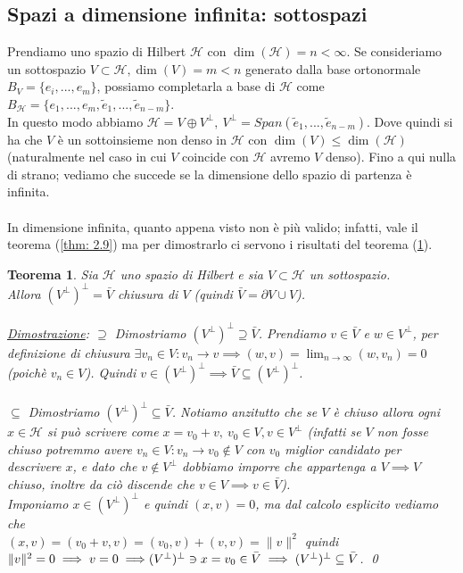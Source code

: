\documentclass[a4paper,12pt]{report}
\newtheorem{teorema}{Teorema}[chapter]
\newcommand{\lt}{<}
\begin{document}
\newpage

\subsection{Spazi a dimensione infinita: sottospazi}

Prendiamo uno spazio di Hilbert $\mathscr{H}$ con $\dim(\mathscr{H})=n \lt\infty$. Se consideriamo un sottospazio $V\subset \mathscr{H}, \dim(V)=m\lt n$ generato dalla base ortonormale $B_V=\{e_i,...,e_m\}$, possiamo completarla a base di $\mathscr{H}$ come $B_{\mathscr{H}}=\{e_1,...,e_m,\tilde{e}_1,..., \tilde{e}_{n-m}\}$. 
\\ In questo modo abbiamo $\mathscr{H}=V \oplus V^{\perp}, \ V^{\perp}=Span(\tilde{e}_1,...,\tilde{e}_{n-m})$. Dove quindi si ha che $V$ è un sottoinsieme non denso in $\mathscr{H}$ con $\dim(V)\leq\dim(\mathscr{H})$ (naturalmente nel caso in cui $V$ coincide con $\mathscr{H}$ avremo $V$ denso). Fino a qui nulla di strano; vediamo che succede se la dimensione dello spazio di partenza è infinita.
\\
\\In dimensione infinita, quanto appena visto non è più valido; infatti, vale il teorema (\ref{thm: 2.9}) ma per dimostrarlo ci servono i risultati del teorema (\ref{thm: 2.8}).

\begin{teorema}\label{thm: 2.8}
    Sia $\mathscr{H}$ uno spazio di Hilbert e sia $V\subset \mathscr{H}$ un sottospazio. 
    \\Allora $(V^{\perp})^{\perp}=\bar{V}$ chiusura di $V$ (quindi $\bar{V}=\partial V\cup V$).
    \\
    \\\underline{Dimostrazione}: $\boxed{\supseteq}$ Dimostriamo $(V^{\perp})^{\perp}\supseteq\bar{V}$. Prendiamo $v\in \bar{V}$ e $w\in V^{\perp}$, per definizione di chiusura $\exists v_n \in V:v_n\to v\implies (w,v)=\displaystyle\lim_{n\to\infty}(w,v_n)=0$ (poichè $v_n \in V$). Quindi $v\in (V^{\perp})^{\perp}\implies \bar{V} \subseteq (V^{\perp})^{\perp}$.
    \\
    \\$\boxed{\subseteq}$ Dimostriamo $(V^{\perp})^{\perp} \subseteq \bar{V}$. Notiamo anzitutto che se $V$ è chiuso allora ogni $x \in \mathscr{H}$ si può scrivere come $x=v_0+v, \ v_0\in V, v\in V^{\perp}$ (infatti se $V$ non fosse chiuso potremmo avere $v_n\in V:v_n\to v_0\notin V$ con $v_0$ miglior candidato per descrivere $x$, e dato che $v \notin V^
    {\perp}$ dobbiamo imporre che appartenga a $V\implies V$ chiuso, inoltre da ciò discende che $v \in V \implies v \in \bar{V}$).
    \\ Imponiamo $x\in (V^{\perp})^{\perp}$ e quindi $(x,v)=0$, ma dal calcolo esplicito vediamo che 
    \\$(x,v)=(v_0+v,v)=(v_0,v)+(v,v)=\|v\|^2$ quindi $\|v\|^2=0 \implies v=0\implies
    \\(V^{\perp})^{\perp}\ni x=v_0 \in \bar{V} \implies (V^{\perp})^{\perp} \subseteq \bar{V}$. \qed
\end{teorema}
\end{document}
